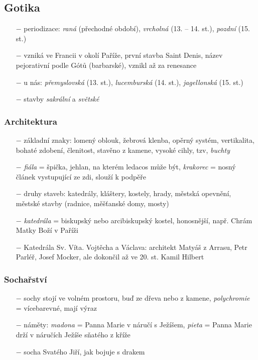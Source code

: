 \documentclass{article}
\begin{document}
\subsection*{Gotika}
\begin{itemize}
    \vspace{-0.5em}
    \setlength\itemsep{0.15em}
    \item[$-$] periodizace: \textit{raná} (přechodné období), \textit{vrcholná} (13. -- 14. st.), \textit{pozdní} (15. st.)
    \item[$-$] vzniká ve Francii v okolí Paříže, první stavba Saint Denis, název pejorativní podle Gótů (barbarské), vznikl až za renesance
    \item[$-$] u nás: \textit{přemyslovská} (13. st.), \textit{lucemburská} (14. st.), \textit{jagellonská} (15. st.)
    \item[$-$] stavby \textit{sakrální} a \textit{světské}
\end{itemize}

\subsubsection*{Architektura}
\begin{itemize}
    \vspace{-0.5em}
    \setlength\itemsep{0.15em}
    \item[$-$] základní znaky: lomený oblouk, žebrová klenba, opěrný systém, vertikalita, bohaté zdobení, členitost, stavěno z kamene, vysoké cihly, tzv, \textit{buchty}
    \item[$-$] \textit{fiála} = špička, jehlan, na kterém ledacos může být, \textit{krakorec} = nosný článek vystupující ze zdi, slouží k podpěře
    \item[$-$] druhy staveb: katedrály, kláštery, kostely, hrady, městská opevnění, městské stavby (radnice, měšťanské domy, mosty)
    \item[$-$] \textit{katedrála} = biskupský nebo arcibiskupský kostel, honosnější, např. Chrám Matky Boží v Paříži
    \item[$-$] Katedrála Sv. Víta. Vojtěcha a Václava: architekt Matyáš z Arrasu, Petr Parléř, Josef Mocker, ale dokončil až ve 20. st. Kamil Hilbert
\end{itemize}

\subsubsection*{Sochařství}
\begin{itemize}
    \vspace{-0.5em}
    \setlength\itemsep{0.15em}
    \item[$-$] sochy stojí ve volném prostoru, buď ze dřeva nebo z kamene, \textit{polychromie}  = vícebarevné, mají výraz
    \item[$-$] náměty: \textit{madona} = Panna Marie v náručí s Ježíšem, \textit{pieta} =
Panna Marie drží v náručích Ježíše sňatého z kříže
    \item[$-$] socha Svatého Jiří, jak bojuje s drakem

\end{itemize}
\end{document}
